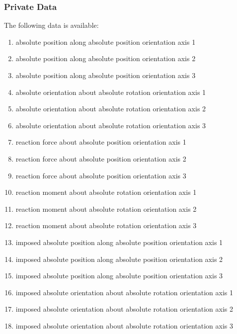 \subsubsection{Private Data}
The following data is available:
\begin{enumerate}
\item {} absolute position along absolute position orientation axis 1
\item {} absolute position along absolute position orientation axis 2
\item {} absolute position along absolute position orientation axis 3
\item {} absolute orientation about absolute rotation orientation axis 1
\item {} absolute orientation about absolute rotation orientation axis 2
\item {} absolute orientation about absolute rotation orientation axis 3
\item {} reaction force about absolute position orientation axis 1
\item {} reaction force about absolute position orientation axis 2
\item {} reaction force about absolute position orientation axis 3
\item {} reaction moment about absolute rotation orientation axis 1
\item {} reaction moment about absolute rotation orientation axis 2
\item {} reaction moment about absolute rotation orientation axis 3
\item {} imposed absolute position along absolute position orientation axis 1
\item {} imposed absolute position along absolute position orientation axis 2
\item {} imposed absolute position along absolute position orientation axis 3
\item {} imposed absolute orientation about absolute rotation orientation axis 1
\item {} imposed absolute orientation about absolute rotation orientation axis 2
\item {} imposed absolute orientation about absolute rotation orientation axis 3
\end{enumerate}

